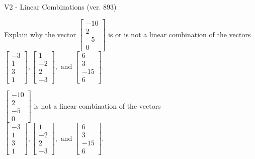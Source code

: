 \begin{exercise}
  \begin{exerciseTitle}V2 - Linear Combinations (ver. 893)\end{exerciseTitle}
  \begin{exerciseStatement}
    Explain why the vector \(\left[\begin{array}{c}
-10 \\
2 \\
-5 \\
0
\end{array}\right]\)  is or is not a linear 
	combination of the vectors \(\left[\begin{array}{c}
-3 \\
1 \\
3 \\
1
\end{array}\right] , \left[\begin{array}{c}
1 \\
-2 \\
2 \\
-3
\end{array}\right] , \text{ and } \left[\begin{array}{c}
6 \\
3 \\
-15 \\
6
\end{array}\right]\).
	


  \end{exerciseStatement}
  \begin{exerciseAnswer}
   \(\left[\begin{array}{c}
-10 \\
2 \\
-5 \\
0
\end{array}\right]\) 
  	 is not  
	a linear combination of the vectors \(\left[\begin{array}{c}
-3 \\
1 \\
3 \\
1
\end{array}\right] , \left[\begin{array}{c}
1 \\
-2 \\
2 \\
-3
\end{array}\right] , \text{ and } \left[\begin{array}{c}
6 \\
3 \\
-15 \\
6
\end{array}\right]\).

	
  


  \end{exerciseAnswer}
\end{exercise}